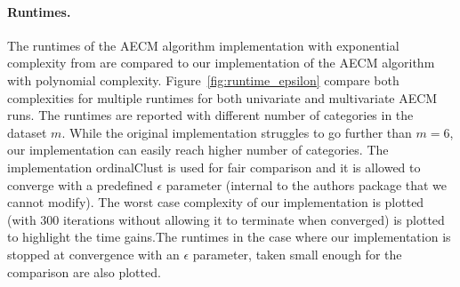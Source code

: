 \paragraph{Runtimes.}
The runtimes of the AECM algorithm implementation with exponential complexity from \citet{biernacki2016model} 
are compared to our implementation of the AECM algorithm with polynomial complexity. Figure~\ref{fig:runtime_epsilon}  compare both complexities for multiple runtimes for both univariate and multivariate AECM runs. The runtimes are reported with different number of categories in the dataset $m$. While the original implementation struggles to go further than $m=6$, our implementation can easily reach higher number of categories. The implementation ordinalClust \cite{selosse2021ordinalclust} is used for fair comparison and it is allowed to converge with a predefined $\epsilon$ parameter (internal to the authors package that we cannot modify). 
The worst case complexity of our implementation is plotted (with $300$ iterations without allowing it to terminate when converged) is plotted to highlight the time gains.The runtimes in the case where our implementation is stopped at convergence with an $\epsilon$ parameter, taken small enough for the comparison are also plotted.
